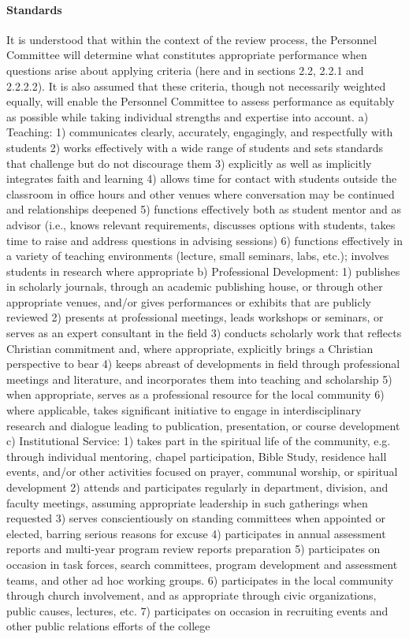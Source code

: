 \documentclass[letterpaper, 11pt]{article}
\begin{document}
			\paragraph{Standards}
				It is understood that within the context of the review process, the Personnel Committee will determine what constitutes appropriate performance when questions arise about applying criteria (here and in sections 2.2, 2.2.1 and 2.2.2.2).  It is also assumed that these criteria, though not necessarily weighted equally, will enable the Personnel Committee to assess performance as equitably as possible while taking individual strengths and expertise into account.
				a) Teaching:
				1) communicates clearly, accurately, engagingly, and respectfully with students
				2) works effectively with a wide range of students and sets standards that challenge but do not discourage them
				3) explicitly as well as implicitly integrates faith and learning
				4) allows time for contact with students outside the classroom in office hours and other venues where conversation may be continued and relationships deepened
				5) functions effectively both as student mentor and as advisor (i.e., knows relevant requirements, discusses options with students, takes time to raise and address questions in advising sessions)
				6) functions effectively in a variety of teaching environments (lecture, small seminars, labs, etc.); involves students in research where appropriate
				b) Professional Development:
				1) publishes in scholarly journals, through an academic publishing house, or through other appropriate venues, and/or gives performances or exhibits that are publicly reviewed
				2) presents at professional meetings, leads workshops or seminars, or serves as an expert consultant in the field
				3) conducts scholarly work that reflects Christian commitment and, where appropriate, explicitly brings a Christian perspective to bear
				4) keeps abreast of developments in field through professional meetings and literature, and incorporates them into teaching and scholarship
				5) when appropriate, serves as a professional resource for the local community
				6) where applicable, takes significant initiative to engage in interdisciplinary research and dialogue leading to publication, presentation, or course development
				c) Institutional Service:
				1) takes part in the spiritual life of the community, e.g. through individual mentoring, chapel participation, Bible Study, residence hall events, and/or other activities focused on prayer, communal worship, or spiritual development
				2) attends and participates regularly in department, division, and faculty meetings, assuming appropriate leadership in such gatherings when requested
				3) serves conscientiously on standing committees when appointed or elected, barring serious reasons for excuse
				4) participates in annual assessment reports and multi-year program review reports preparation
				5) participates on occasion in task forces, search committees, program development and assessment teams, and other ad hoc working groups.
				6) participates in the local community through church involvement, and as appropriate through civic organizations, public causes, lectures, etc.
				7) participates on occasion in recruiting events and other public relations efforts of the college
\end{document}
